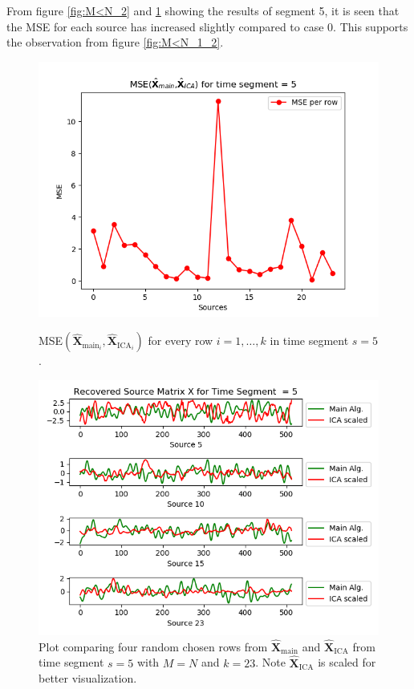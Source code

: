 \noindent 
From figure \ref{fig:M<N_2} and \ref{fig:M<N_3} showing the results of segment 5, it is seen that the MSE for each source has increased slightly compared to case 0. 
This supports the observation from figure \ref{fig:M<N_1_2}.      
\begin{figure}[H]
\begin{widepage}
    \begin{minipage}[t]{.45\textwidth}
\centering
\includegraphics[width=1\linewidth]{figures/ch_7/resultat/mse_third_removed_ica_timeseg5.png}
\caption{MSE$\left(\hat{\mathbf{X}}_{\text{main}_{i}},\hat{\mathbf{X}}_{\text{ICA}_{i}}\right)$ for every row $i = 1, \dots, k$ in time segment $s=5$.}
\label{fig:M<N_2}
\end{minipage} 
\hspace{0.5cm}
\begin{minipage}[t]{.45\textwidth}
\centering
\includegraphics[width=1\linewidth]{figures/ch_7/resultat/EEG_third_removed_scaled_timeseg5S1_CClean.png}
\caption{Plot comparing four random chosen rows from $\hat{\mathbf{X}}_{\text{main}}$ and $\hat{\mathbf{X}}_{\text{ICA}}$ from time segment $s = 5$ with $M = N$ and $k=23$. Note $\hat{\mathbf{X}}_{\text{ICA}}$ is scaled for better visualization.}
	\label{fig:M<N_3}
    \end{minipage}
\end{widepage}
\end{figure}
